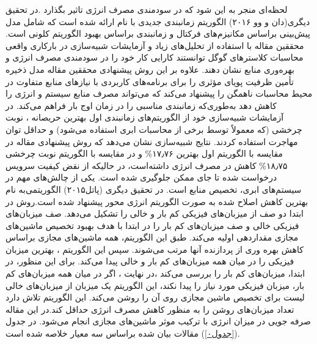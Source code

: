   لحظه‌ای منجر به این شود  که در سودمندی مصرف انرژی تاثیر بگذارد .در تحقیق دیگری(دان و وو ۲۰۱۶)
  الگوریتم زمانبندی جدیدی با نام
  ارائه شده است که شامل مدل پیش‌بینی بر‌اساس مکانیزم‌های فرکتال
  و
   زمانبندی براساس بهبود الگوریتم کلونی است.  محققین مقاله با استفاده از تحلیل‌های زیاد و آزمایشات شبیه‌سازی در بارکاری واقعی محاسبات کلاسترهای گوگل توانستند کارایی کار خود را در سودمندی مصرف انرژی و بهره‌وری منابع نشان دهند. علاوه بر این روش پیشنهادی محققین مقاله مدل ذخیره تأمین ظرفیت پویای مؤثری را برای برنامه‌های کاربردی با نیازهای منابع متفاوت در محیط محاسبات ناهمگن را پیشنهاد می‌کند که می‌تواند مصرف منابع سیستم و انرژی را کاهش دهد به‌طوری‌که زمانبندی مناسبی را در زمان اوج بار فراهم می‌کند.  در آزمایشات شبیه‌سازی خود از الگوریتم‌های زمانبندی اول بهترین حریصانه
   ،
    نوبت چرخشی
     (که معمولاً توسط برخی از محاسبات ابری استفاده می‌شود)  و حداقل توان مهاجرت استفاده کردند. نتایج شبیه‌سازی نشان می‌دهد که روش پیشنهادی مقاله در مقایسه با الگوریتم اول بهترین
۱۷٫۷۶\%
     و در مقایسه با الگوریتم نوبت چرخشی
۱۸٫۷۵\%
     کاهش در مصرف انرژی داشته‌است، در حالیکه از نقض کیفیت سرویس درخواست شده تا جای ممکن جلوگیری شده است.
یکی از چالش‌های مهم در سیستم‌های ابری، تخصیص منابع است. در تحقیق دیگری (پاتل۲۰۱۵)
الگوریتمی‌به نام  بهترین کاهش اصلاح شده 
 به صورت الگوریتم انرژی محور
 پیشنهاد شده است.روش 
 \lr{EABFD} 
 در ابتدا دو صف از میزبان‌های فیزیکی کم بار و خالی را تشکیل می‌دهد. صف میزبان‌های فیزیکی خالی و صف میزبان‌های کم بار را در ابتدا با هدف بهبود تخصیص ماشین‌های مجازی مقداردهی اولیه می‌کند. طبق این الگوریتم، همه ماشین‌های مجازی براساس کاهش بهره وری از پردازنده آنها  مرتب می‌شوند. سپس این الگوریتم ، بهترین میزبان فیزیکی را در میان همه میزبان‌های کم بار و خالی پیدا می‌کند. برای این منظور، در ابتدا، میزبان‌های کم بار را بررسی می‌کند ،در نهایت ،  اگر در میان همه میزبان‌های کم بار، میزبان فیزیکی مورد نیاز را  پیدا نکند، این الگوریتم یک میزبان از میزبان‌های خالی لیست برای تخصیص ماشین مجازی روی آن را روشن می‌کند. این الگوریتم تلاش دارد تعداد میزبان‌های روشن را به منظور کاهش مصرف انرژی حداقل کند.در این مقاله صرفه جویی در میزان انرژی با ترکیب موثر ماشین‌های مجازی انجام می‌شود. 
  در جدول 
(\ref{جدول۰})
 مقالات بیان شده براساس سه معیار خلاصه شده است.

 \newpage

